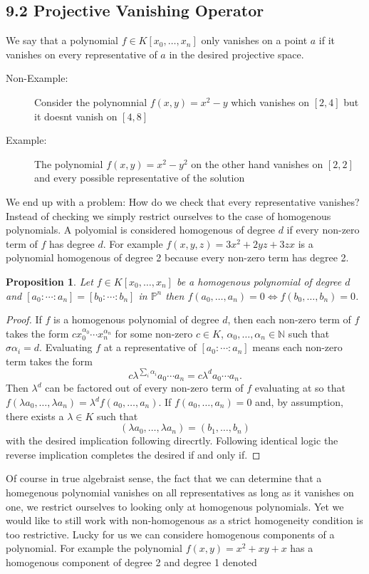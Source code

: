 \documentclass[40pt]{article}
\newcommand{\Proj}{\mathbb{P}}
\newcommand{\N}{\mathbb{N}}
\newtheorem{proposition}{Proposition}[section]
\theoremstyle{remark}
\begin{document}
\subsection{9.2 Projective Vanishing Operator}
We say that a polynomial $f \in K[x_0,\dots,x_n]$ only vanishes on a point $a$ if it vanishes on every representative of $a$ in the desired projective space.
\begin{description}
	\item[Non-Example:] Consider the polynomnial $f(x,y) = x^2 - y$	which vanishes on $[2,4]$ but it doesnt vanish on $[4,8]$
	\item[Example:] The polynomial $f(x,y) = x^2 - y^2$ on the other hand vanishes on $[2,2]$ and every possible representative of the solution
\end{description}
We end up with a problem: How do we check that every representative vanishes? Instead of checking we simply restrict ourselves to the case of homogenous polynomials. A polyomial is considered homogenous of degree $d$ if every non-zero term of $f$ has degree $d$. For example $f(x,y,z)= 3x^2+2yz+3zx$ is a polynomial homogenous of degree 2 because every non-zero term has degree 2.
\begin{proposition}
	Let $f \in K[x_0,\dots,x_n]$ be a homogenous polynomial of degree $d$ and $[a_0:\cdots:a_n]=[b_0:\cdots:b_n]$ in $\Proj^n$ then $f(a_0,\dots,a_n)=0 \iff f(b_0,\dots,b_n) = 0$.
\end{proposition}
\begin{proof}
	If $f$ is a homogenous polynomial of degree $d$, then each non-zero term of $f$ takes the form $cx_0^{\alpha_0}\cdots x_n^{\alpha_n}$ for some non-zero $c \in K$, $\alpha_0,\dots,\alpha_n \in \N$ such that $\sigma \alpha_i = d$. Evaluating $f$ at a representative of $[a_0:\cdots:a_n]$  means each non-zero term takes the form 
	\[
	c\lambda^{\sum_i \alpha_i}a_0 \cdots a_n = c\lambda^da_0\cdots a_n.
	\]
	Then $\lambda^d$ can be factored out of every non-zero term of $f$ evaluating at so that $f(\lambda a_0,\dots, \lambda a_n) = \lambda^df(a_0,\dots,a_n)$.  If $f(a_0,\dots,a_n)=0$ and, by assumption, there exists a $\lambda \in K$ such that 
	\[(\lambda a_0,\dots,\lambda a_n) = (b_1,\dots,b_n)\]
	with the desired implication following direcrtly. Following identical logic the reverse implication completes the desired if and only if. 
\end{proof}
Of course in true algebraist sense, the fact that we can determine that a homegenous polynomial vanishes on all representatives as long as it vanishes on one, we restrict ourselves to looking only at homogenous polynomials. Yet we would like to still work with non-homogenous as a strict homogeneity condition is too restrictive. Lucky for us we can considere homogenous components of a polynomial. For example the polynomial $f(x, y) = x^2 + xy + x$ has a homogenous component of degree 2 and degree 1 denoted
\end{document}
